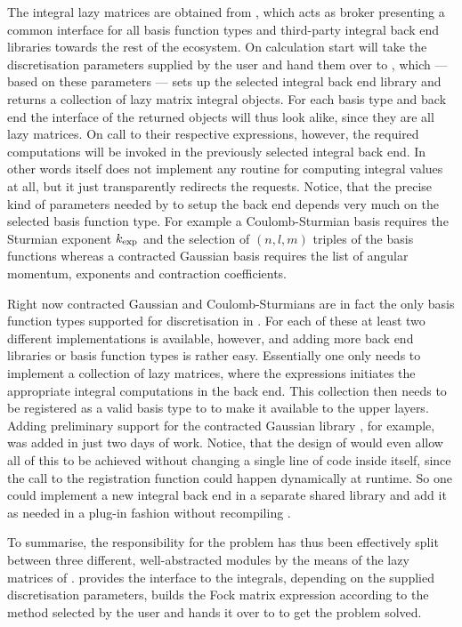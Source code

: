 The integral lazy matrices are obtained from \gint,
which acts as broker presenting a common interface for all
basis function types and third-party integral back end libraries
towards the rest of the \molsturm ecosystem.
On calculation start \molsturm will take the discretisation parameters
supplied by the user and hand them over to \gint,
which --- based on these parameters ---
sets up the selected integral back end library
and returns a collection of lazy matrix integral objects.
For each basis type and back end the interface of the returned objects
will thus look alike, since they are all lazy matrices.
On call to their respective \contraction expressions, however,
the required computations will be invoked in the previously selected
integral back end.
In other words \gint itself does not implement any routine
for computing integral values at all,
but it just transparently redirects the requests.
Notice, that the precise kind of parameters needed by \gint
to setup the back end depends very much
on the selected basis function type.
For example a Coulomb-Sturmian basis requires the Sturmian exponent $k_\text{exp}$
and the selection of $(n, l, m)$ triples of the basis functions
whereas a contracted Gaussian basis requires the list of angular momentum,
exponents and contraction coefficients.

Right now contracted Gaussian and Coulomb-Sturmians
are in fact the only basis function types supported for discretisation in \gint.
For each of these at least two different implementations is available, however,
and adding more back end libraries or basis function types is rather easy.
Essentially one only needs to implement a collection of lazy matrices,
where the \contraction expressions initiates the appropriate
integral computations in the back end.
This collection then needs to be registered as a valid basis type
to \gint to make it available to the upper layers.
Adding preliminary support for the contracted Gaussian library
\libcint, for example, was added in just two days of work.
Notice, that the design of \gint would even allow all of this to be achieved
without changing a single line of code inside \gint itself,
since the call to the registration function could happen dynamically at runtime.
So one could implement a new integral back end in a separate shared library
and add it as needed in a plug-in fashion without recompiling \molsturm.

To summarise, the responsibility for the \HF problem
has thus been effectively split between three different,
well-abstracted modules by the means of the lazy matrices of \lazyten.
\gint provides the interface to the integrals,
depending on the supplied discretisation parameters,
\molsturm builds the Fock matrix expression
according to the method selected by the user
and hands it over to \gscf to get the \SCF problem solved.

